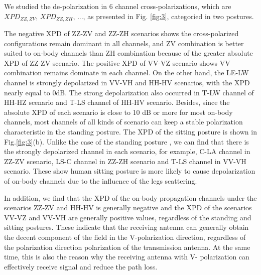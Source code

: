 \documentclass[conference]{IEEEtran}
\begin{document}
We studied the de-polarization in 6 channel cross-polarizations, which are $XPD_{ZZ,ZV}$, $XPD_{ZZ,ZH}$, ..., as presented in Fig. \ref{fig:3}, categoried in two postures.

The negative XPD of ZZ-ZV and ZZ-ZH scenarios shows the cross-polarized configurations remain dominant in all channels, and ZV combination is better suited to on-body channels than ZH combination because of the greater absolute XPD of ZZ-ZV scenario. The positive XPD of VV-VZ scenario shows VV combination remains dominate in each channel. On the other hand, the LE-LW channel is strongly depolarized in VV-VH and HH-HV scenarios, with the XPD nearly equal to 0dB. The strong depolarization also occurred in T-LW channel of HH-HZ scenario and T-LS channel of HH-HV scenario. Besides, since the absolute XPD of each scenario is close to 10 dB or more for most on-body channels, most channels of all kinds of scenario can keep a stable polarization characteristic in the standing posture. The XPD of the sitting posture is shown in Fig.\ref{fig:3}(b). Unlike the case of  the standing posture , we can find that there is the strongly depolarized channel in each scenario, for example, C-LA channel in ZZ-ZV scenario, LS-C channel in ZZ-ZH scenario and T-LS channel in VV-VH scenario. These show human sitting posture is more likely to cause depolarization of on-body channels due to the influence of the legs scattering.

In addition, we find that the XPD of the on-body propagation channels under the scenarios ZZ-ZV and HH-HV is generally negative and the XPD of the scenarios VV-VZ and VV-VH are generally positive values, regardless of the standing and sitting postures. These indicate that the receiving antenna can generally obtain the decent component of the field in the V-polarization direction, regardless of the polarization direction polarization of the transmission antenna. At the same time, this is also the reason why the receiving antenna with V- polarization can effectively receive signal and reduce the path loss.
\end{document}

